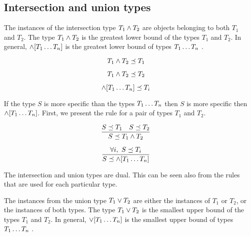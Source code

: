 \documentclass[runningheads]{llncs}
\newcommand{\notes}[1]{\noindent\begin{small}-- \emph{#1}\\\end{small}}
\begin{document}






\subsection{Intersection and union types\label{section:intsc-union}}

The instances of the intersection type $T_1\land\/T_2$ are objects
belonging to both $T_1$ and $T_2$. The type $T_1\land\/T_2$ is the
greatest lower bound of the types $T_1$ and $T_2$. In general,
$\land[T_1\ldots\/T_n]$ is the greatest lower bound of types
$T_1\ldots\/T_n$ \cite{Pierce1991,Pierce1996}.

\begin{equation}
T_1\land\/T_2\preceq\/T_1    
\end{equation}

\begin{equation}
T_1\land\/T_2\preceq\/T_2  
\end{equation}

\begin{equation}
\land[T_1\ldots\/T_n] \preceq\/T_i  
\end{equation}

If the type $S$ is more specific than the types $T_1\ldots\/T_n$ then
$S$ is more specific then $\land[T_1\ldots\/T_n]$. First, we present
the rule for a pair of types $T_1$ and $T_2$.

\begin{equation}
\dfrac{S\preceq\/T_1\quad\/S\preceq\/\/T_2}
      {S\preceq\/T_1\land\/T_2}  
\end{equation}

\begin{equation}
\label{rul:intsc-gather}
\dfrac{\forall i,\ S\preceq\/T_i}
      {S\preceq\land[T_1\ldots\/T_n]}  
\end{equation}



The intersection and union types are dual. This can be seen also from
the rules that are used for each particular type.

The instances from the union type $T_1\lor\/T_2$ are either the
instances of $T_1$ or $T_2$, or the instances of both types. The type
$T_1\lor\/T_2$ is the smallest upper bound of the types $T_1$ and
$T_2$. In general, $\lor[T_1\ldots\/T_n]$ is the smallest upper bound
of types $T_1\ldots\/T_n$ \cite{Pierce1991}.
\end{document}
